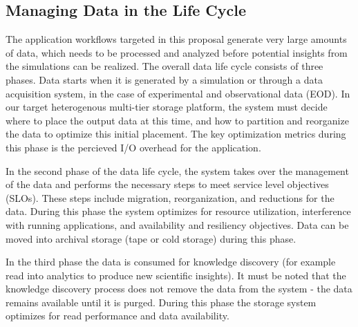\subsection{Managing Data in the Life Cycle}
\label{sec:managing-data-life}

\newcommand{\Sir}{Sirocco} %


The application workflows targeted in this proposal generate very large
amounts of data, which needs to be processed and analyzed before
potential insights from the simulations can be realized. 
The overall data life cycle consists of three phases. Data starts
when it is generated by a simulation or through a data acquisition system,
in the case of experimental and observational data (EOD). 
In our target heterogenous multi-tier storage platform, the system must
decide where to place the output data at this time, and how to partition and
reorganize the data to optimize this initial placement. The key optimization
metrics during this phase is the percieved I/O overhead for the application.

In the second phase of the data life cycle, the system takes over the
management of the data and performs the necessary steps to meet service
level objectives (SLOs). These steps include migration, reorganization, and
reductions for the data. During this phase the system optimizes for resource
utilization, interference with running applications, and availability and
resiliency objectives. Data can be moved into archival storage (tape or cold
storage) during this phase. 

In the third phase the data is consumed for knowledge discovery (for example
read into analytics to produce new scientific insights). It must be noted
that the knowledge discovery process does not remove the data from the
system - the data remains available until it is purged. During this phase
the storage system optimizes for read performance and data availability. 


